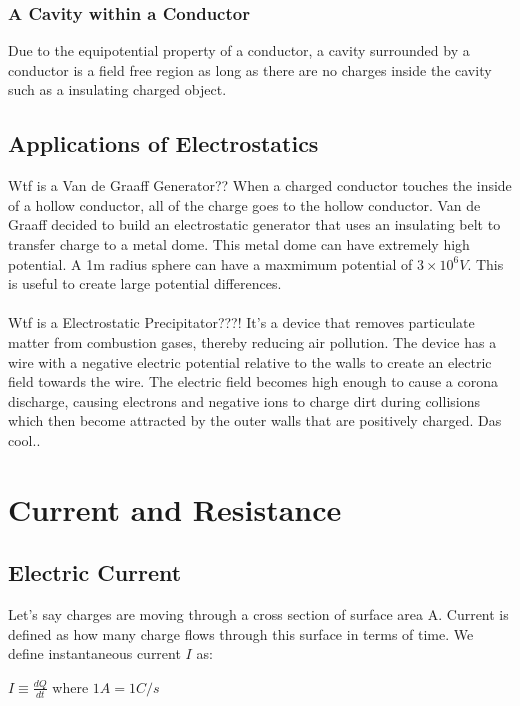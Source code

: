 \documentclass[12pt]{report}
\begin{document}
		\subsection{A Cavity within a Conductor}
			Due to the equipotential property of a conductor, a cavity surrounded by a conductor is a field free region as long as there are no charges inside the cavity such as a insulating charged object.
	\section{Applications of Electrostatics}
		Wtf is a Van de Graaff Generator?? When a charged conductor touches the inside of a hollow conductor, all of the charge goes to the hollow conductor. Van de Graaff decided to build an electrostatic generator that uses an insulating belt to transfer charge to a metal dome. This metal dome can have extremely high potential. A 1m radius sphere can have a maxmimum potential of $ 3 \times 10^6 V$. This is useful to create large potential differences. \\
		\\
		Wtf is a Electrostatic Precipitator???! It's a device that removes particulate matter from combustion gases, thereby reducing air pollution. The device has a wire with a negative electric potential relative to the walls to create an electric field towards the wire. The electric field becomes high enough to cause a corona discharge, causing electrons and negative ions to charge dirt during collisions which then become attracted by the outer walls that are positively charged. Das cool..
\chapter{Current and Resistance}
	\section{Electric Current}
		Let's say charges are moving through a cross section of surface area A. Current is defined as how many charge flows through this surface in terms of time. We define instantaneous current $I$ as:\\
		\centerline{$I \equiv \frac{dQ}{dt}$ where $1A = 1C/s$}
\end{document}

